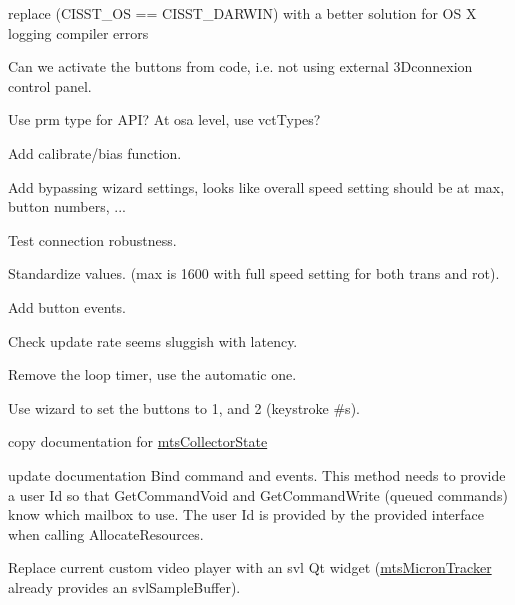 
\begin{DoxyRefList}
\item[\label{todo__todo000001}%
\hypertarget{todo__todo000001}{}%
Member \hyperlink{cmn_logger_8h_adda96d359bb6be5ef4ad871018bb2b58}{C\-M\-N\-\_\-\-L\-O\-G\-\_\-\-C\-L\-A\-S\-S\-\_\-\-I\-N\-S\-T\-A\-N\-C\-E} (object\-Pointer, lod)]replace (C\-I\-S\-S\-T\-\_\-\-O\-S == C\-I\-S\-S\-T\-\_\-\-D\-A\-R\-W\-I\-N) with a better solution for O\-S X logging compiler errors  
\item[\label{todo__todo000014}%
\hypertarget{todo__todo000014}{}%
File \hyperlink{mts3_dconnexion_8h}{mts3\-Dconnexion.h} ]Can we activate the buttons from code, i.\-e. not using external 3\-Dconnexion control panel. 

Use prm type for A\-P\-I? At osa level, use vct\-Types? 

Add calibrate/bias function. 

Add bypassing wizard settings, looks like overall speed setting should be at max, button numbers, ... 

Test connection robustness. 

Standardize values. (max is 1600 with full speed setting for both trans and rot). 

Add button events. 

Check update rate seems sluggish with latency. 

Remove the loop timer, use the automatic one. 

Use wizard to set the buttons to 1, and 2 (keystroke \#s).  
\item[\label{todo__todo000008}%
\hypertarget{todo__todo000008}{}%
Member \hyperlink{classmts_collector_event_a9e9b47581d6445e5f0c5a71f70afe8e7}{mts\-Collector\-Event\-:\-:Connect} (void)]copy documentation for \hyperlink{classmts_collector_state}{mts\-Collector\-State}  
\item[\label{todo__todo000009}%
\hypertarget{todo__todo000009}{}%
Member \hyperlink{classmts_interface_required_a8830a8a10b35d4a57396edbb4e328012}{mts\-Interface\-Required\-:\-:Add\-System\-Event\-Handlers} (void)]update documentation Bind command and events. This method needs to provide a user Id so that Get\-Command\-Void and Get\-Command\-Write (queued commands) know which mailbox to use. The user Id is provided by the provided interface when calling Allocate\-Resources.  
\item[\label{todo__todo000015}%
\hypertarget{todo__todo000015}{}%
File \hyperlink{mts_micron_tracker_8h}{mts\-Micron\-Tracker.h} ]Replace current custom video player with an svl Qt widget (\hyperlink{classmts_micron_tracker}{mts\-Micron\-Tracker} already provides an svl\-Sample\-Buffer). 


\end{DoxyRefList}
